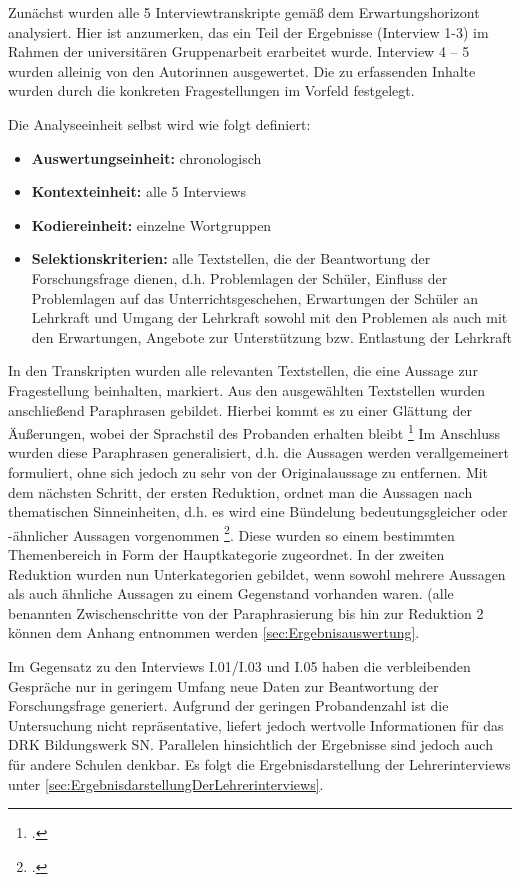 Zunächst wurden alle 5 Interviewtranskripte gemäß dem Erwartungshorizont analysiert. Hier ist anzumerken, das ein Teil der Ergebnisse (Interview 1-3) im Rahmen der universitären Gruppenarbeit erarbeitet wurde. Interview 4 -- 5 wurden alleinig von den Autorinnen ausgewertet. Die zu erfassenden Inhalte wurden durch die konkreten  Fragestellungen im Vorfeld festgelegt. 

Die Analyseeinheit selbst wird wie folgt definiert:

\begin{itemize}
	\item \textbf{Auswertungseinheit:} chronologisch
	\item \textbf{Kontexteinheit:} alle 5 Interviews
	\item \textbf{Kodiereinheit:} einzelne Wortgruppen
	\item \textbf{Selektionskriterien:} alle Textstellen, die der Beantwortung der Forschungsfrage dienen, d.h. Problemlagen der Schüler, Einfluss der Problemlagen auf das Unterrichtsgeschehen, Erwartungen der Schüler an Lehrkraft und Umgang der Lehrkraft sowohl mit den Problemen als auch mit den Erwartungen, Angebote zur Unterstützung bzw. Entlastung der Lehrkraft
\end{itemize}

In den Transkripten wurden alle relevanten Textstellen, die eine Aussage zur Fragestellung beinhalten, markiert. Aus den ausgewählten Textstellen wurden anschließend Paraphrasen gebildet. Hierbei kommt es zu einer Glättung der Äußerungen, wobei der Sprachstil des Probanden erhalten bleibt \footcite[vgl.][138]{Krueger2014} Im Anschluss wurden diese Paraphrasen generalisiert, d.h. die Aussagen werden verallgemeinert formuliert, ohne sich jedoch zu sehr von der Originalaussage zu entfernen. Mit dem nächsten Schritt, der ersten Reduktion, ordnet man die Aussagen nach thematischen Sinneinheiten, d.h. es wird eine Bündelung bedeutungsgleicher oder -ähnlicher Aussagen vorgenommen \footcite[vgl.][139]{Krueger2014}. Diese wurden so einem bestimmten Themenbereich in Form der Hauptkategorie zugeordnet. In der zweiten Reduktion wurden nun Unterkategorien gebildet, wenn sowohl mehrere Aussagen als auch ähnliche Aussagen zu einem Gegenstand vorhanden waren. (alle benannten Zwischenschritte von der Paraphrasierung bis hin zur Reduktion 2 können dem Anhang entnommen werden \ref{sec:Ergebnisauswertung}.

Im Gegensatz zu den Interviews I.01/I.03 und I.05 haben die verbleibenden Gespräche nur in geringem Umfang neue Daten zur Beantwortung der Forschungsfrage generiert. Aufgrund der geringen Probandenzahl ist die Untersuchung nicht repräsentative, liefert jedoch wertvolle Informationen für das DRK Bildungswerk SN. Parallelen hinsichtlich der Ergebnisse sind jedoch auch für andere Schulen denkbar. 
Es folgt die Ergebnisdarstellung der Lehrerinterviews unter \ref{sec:ErgebnisdarstellungDerLehrerinterviews}.